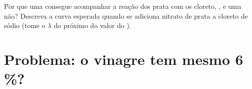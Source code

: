 \begin{exercise}[$\star\star\star$]\label{exo:g12:ph-conductivity-titrations:15}
Por que uma  consegue acompanhar a reação dos
 prata com os  cloreto, , e uma
 não? Descreva a curva esperada quando se
adiciona nitrato de prata a cloreto de sódio (tome o $\lambda$ do
 próximo do valor do ).
\end{exercise}

\section{Problema: o vinagre tem mesmo 6\,\%?}


